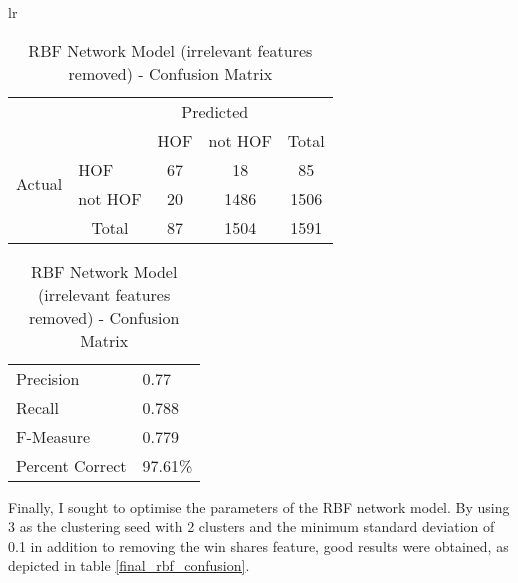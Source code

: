 \documentclass[paper=a4, fontsize=11pt]{scrartcl} %
\numberwithin{equation}{section} %
\numberwithin{figure}{section} %
\numberwithin{table}{section} %
\begin{document}
\begin{table}[thb]
\centering
\caption{\label{rbf_confusion_feature}RBF Network Model (irrelevant features removed) - Confusion Matrix}
\begin{tabular}{lr}

\begin{tabular}{l|l|c|c|c}
\multicolumn{2}{c}{}&\multicolumn{2}{c}{Predicted}&\\
\cline{3-4}
\multicolumn{2}{c|}{}& HOF & not HOF &\multicolumn{1}{c}{Total}\\
\cline{2-4}
\multirow{2}{*}{Actual}& HOF & 67 & 18 & 85\\
\cline{2-4}
& not HOF & 20 & 1486 & 1506\\
\cline{2-4}
\multicolumn{1}{c}{} & \multicolumn{1}{c}{Total} & \multicolumn{1}{c}{87} & \multicolumn{1}{c}{1504} & \multicolumn{1}{c}{1591}\\
\end{tabular}

\begin{tabular}{ | l | l | }
\hline
  Precision & 0.77 \\
  Recall & 0.788  \\
  F-Measure & 0.779 \\
  Percent Correct & 97.61\%\\
  \hline
\end{tabular}

\end{tabular}
\end{table}

Finally, I sought to optimise the parameters of the RBF network model. By using 3 as the clustering seed with 2 clusters and the minimum standard deviation of 0.1 in addition to removing the win shares feature, good results were obtained, as depicted in table \ref{final_rbf_confusion}. 
\end{document}
